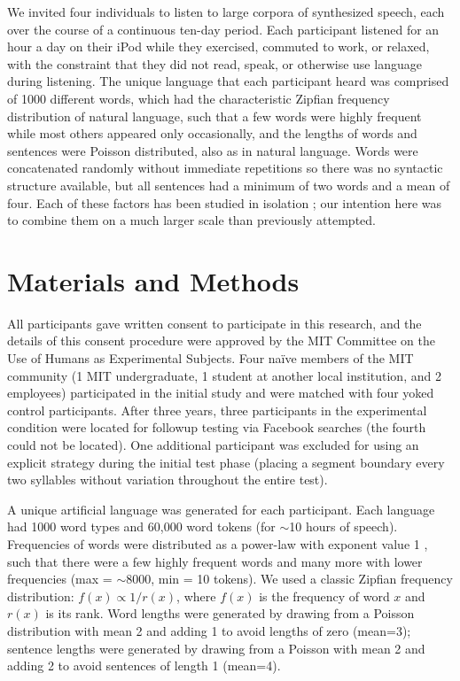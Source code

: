 \documentclass[10pt]{article}
\begin{document}
We invited four individuals to listen to large corpora of synthesized speech, each over the course of a continuous ten-day period. Each participant listened for an hour a day on their iPod while they exercised, commuted to work, or relaxed, with the constraint that they did not read, speak, or otherwise use language during listening. The unique language that each participant heard was comprised of 1000 different words, which had the characteristic Zipfian frequency distribution of natural language, such that a few words were highly frequent while most others appeared only occasionally, and the lengths of words and sentences were Poisson distributed, also as in natural language. Words were concatenated randomly without immediate repetitions so there was no syntactic structure available, but all sentences had a minimum of two words and a mean of four. Each of these factors has been studied in isolation \cite{frank2010,kurumada2011}; our intention here was to combine them on a much larger scale than previously attempted. 

\section*{Materials and Methods}

All participants gave written consent to participate in this research, and the details of this consent procedure were approved by the MIT Committee on the Use of Humans as Experimental Subjects. Four na\"ive members of the MIT community (1 MIT undergraduate, 1 student at another local institution, and 2 employees) participated in the initial study and were matched with four yoked control participants. After three years, three participants in the experimental condition were located for followup testing via Facebook searches (the fourth could not be located). One additional participant was excluded for using an explicit strategy during the initial test phase (placing a segment boundary every two syllables without variation throughout the entire test). 

A unique artificial language was generated for each participant. Each language had 1000 word types and 60,000 word tokens (for $\sim$10 hours of speech). Frequencies of words were distributed as a power-law with exponent value 1 \cite{zipf1965}, such that there were a few highly frequent words and many more with lower frequencies (max = $\sim$8000, min = 10 tokens). We used a classic Zipfian frequency distribution: $f(x) \propto 1 / r(x)$, where $f(x)$ is the frequency of word $x$ and $r(x)$ is its rank. Word lengths were generated by drawing from a Poisson distribution with mean 2 and adding 1 to avoid lengths of zero (mean=3); sentence lengths were generated by drawing from a Poisson with mean 2 and adding 2 to avoid sentences of length 1 (mean=4). 
\end{document}
